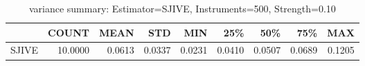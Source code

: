 \begin{table}[ht]
\centering
\caption{variance summary: Estimator=SJIVE, Instruments=500, Strength=0.10}
\begin{tabular}{lrrrrrrrr}
\toprule
 & COUNT & MEAN & STD & MIN & 25\% & 50\% & 75\% & MAX \\
\midrule
SJIVE & 10.0000 & 0.0613 & 0.0337 & 0.0231 & 0.0410 & 0.0507 & 0.0689 & 0.1205 \\
\bottomrule
\end{tabular}
\end{table}
